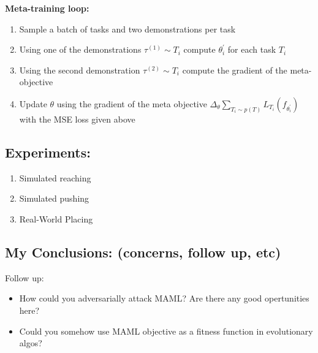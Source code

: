 \textbf{Meta-training loop:}
\begin{enumerate}
    \item Sample a batch of tasks and two demonstrations per task
    \item Using one of the demonstrations $\tau^{(1)} \sim T_i$ compute $\theta^{'}_{i}$ for each task $T_i$
    \item Using the second demonstration $\tau^{(2)} \sim T_i$ compute the gradient of the meta-objective
    \item Update $\theta$ using the gradient of the meta objective
          $\Delta_\theta \sum_{T_i \sim p(T)} L_{T_i}(f_{\theta^{'}_{i}})$ with the MSE loss given above
\end{enumerate}

\subsection{Experiments:}

\begin{enumerate}
    \item Simulated reaching
    \item Simulated pushing
    \item Real-World Placing
\end{enumerate}

\subsection{My Conclusions: (concerns, follow up, etc)}

Follow up:

\begin{itemize}
    \item How could you adversarially attack MAML? Are there any good opertunities here?
    \item Could you somehow use MAML objective as a fitness function in evolutionary algos?
\end{itemize}

